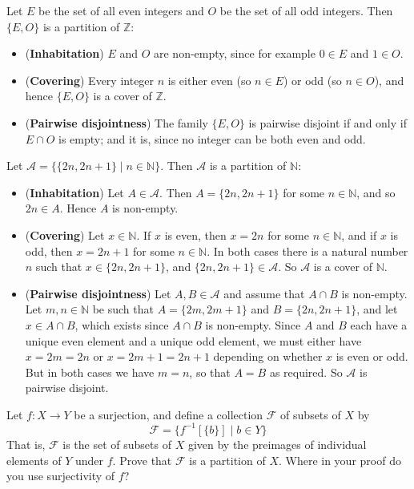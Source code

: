 \begin{example}
\label{exPartitionOfZIntoEvenAndOdd}
Let $E$ be the set of all even integers and $O$ be the set of all odd integers. Then $\{ E, O \}$ is a partition of $\mathbb{Z}$:
\begin{itemize}
\item (\textbf{Inhabitation}) $E$ and $O$ are non-empty, since for example $0 \in E$ and $1 \in O$.
\item (\textbf{Covering}) Every integer $n$ is either even (so $n \in E$) or odd (so $n \in O$), and hence $\{ E, O \}$ is a cover of $\mathbb{Z}$.
\item (\textbf{Pairwise disjointness}) The family $\{ E, O \}$ is pairwise disjoint if and only if $E \cap O$ is empty; and it is, since no integer can be both even and odd.
\end{itemize}
\end{example}

\begin{example}
\label{exPartitionOfNIntoPairs}
Let $\mathcal{A} = \{ \{ 2n, 2n+1 \} \mid n \in \mathbb{N} \}$. Then $\mathcal{A}$ is a partition of $\mathbb{N}$:
\begin{itemize}
\item (\textbf{Inhabitation}) Let $A \in \mathcal{A}$. Then $A = \{ 2n, 2n+1 \}$ for some $n \in \mathbb{N}$, and so $2n \in A$. Hence $A$ is non-empty.
\item (\textbf{Covering}) Let $x \in \mathbb{N}$. If $x$ is even, then $x=2n$ for some $n \in \mathbb{N}$, and if $x$ is odd, then $x=2n+1$ for some $n \in \mathbb{N}$. In both cases there is a natural number $n$ such that $x \in \{ 2n, 2n+1 \}$, and $\{ 2n, 2n+1 \} \in \mathcal{A}$. So $\mathcal{A}$ is a cover of $\mathbb{N}$.
\item (\textbf{Pairwise disjointness}) Let $A,B \in \mathcal{A}$ and assume that $A \cap B$ is non-empty. Let $m,n \in \mathbb{N}$ be such that $A = \{ 2m, 2m+1 \}$ and $B = \{ 2n, 2n+1 \}$, and let $x \in A \cap B$, which exists since $A \cap B$ is non-empty. Since $A$ and $B$ each have a unique even element and a unique odd element, we must either have $x=2m=2n$ or $x=2m+1=2n+1$ depending on whether $x$ is even or odd. But in both cases we have $m=n$, so that $A=B$ as required. So $\mathcal{A}$ is pairwise disjoint.
\end{itemize}
\end{example}

\begin{exercise}
\label{exPreimagesFormPartition}
Let $f : X \to Y$ be a surjection, and define a collection $\mathcal{F}$ of subsets of $X$ by
\[ \mathcal{F} = \{ f^{-1}[\{b\}] \mid b \in Y \} \]
That is, $\mathcal{F}$ is the set of subsets of $X$ given by the preimages of individual elements of $Y$ under $f$. Prove that $\mathcal{F}$ is a partition of $X$. Where in your proof do you use surjectivity of $f$?
\end{exercise}

